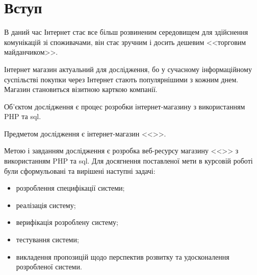 \section*{Вступ}
В даний час Інтернет стає все більш розвиненим середовищем для здійснення комунікацій зі споживачами, він стає зручним і досить дешевим <<торговим майданчиком>>. 

Інтернет магазин актуальний для дослідження, бо у сучасному інформаційному суспільстві покупки через Інтернет стають популярнішими з кожним днем. 
Магазин становиться візитною карткою компанії. 

Об'єктом дослідження є процес розробки інтернет-магазину з використанням PHP та \acrshort{sql}. 

Предметом дослідження є інтернет-магазин <<\thesitename>>. 

Метою і завданням дослідження є розробка веб-ресурсу магазину <<\thesitename>> з використанням PHP та \acrshort{sql}.
Для досягнення поставленої мети в курсовій роботі були сформульовані та вирішені наступні задачі:
\begin{itemize}
	\item розроблення специфікації системи;
	\item реалізація систему;
	\item верифікація розроблену систему;
	\item тестування системи;
	\item викладення пропозицій щодо перспектив розвитку та удосконалення розробленої системи.
\end{itemize}
